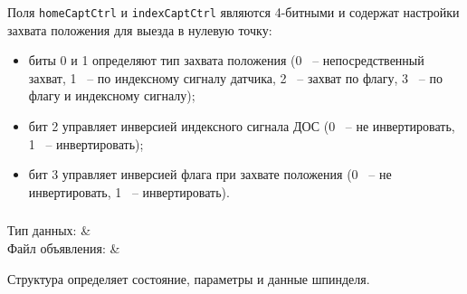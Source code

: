 Поля \texttt{homeCaptCtrl} и \texttt{indexCaptCtrl} являются 4-битными и содержат настройки захвата положения для выезда в нулевую точку:
\begin{itemize}
\item биты 0 и 1 определяют тип захвата положения (0 ~-- непосредственный захват, 1 ~--  по индексному сигналу датчика, 2 ~-- захват по флагу, 3 ~-- по флагу и индексному сигналу); \killoverfullbefore
\item бит 2 управляет инверсией индексного сигнала ДОС (0 ~-- не инвертировать, 1 ~-- инвертировать); \killoverfullbefore
\item бит 3 управляет инверсией флага при захвате положения (0 ~-- не инвертировать, 1 ~-- инвертировать). \killoverfullbefore \BL
\end{itemize} 
\subsubsection{}
\label{sec:Spindle}

\begin{fHeader}
    Тип данных:            & \\
    Файл объявления:             &  \\
\end{fHeader}

Структура определяет состояние, параметры и данные шпинделя.

